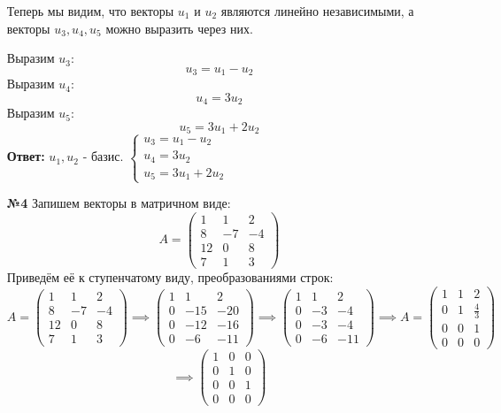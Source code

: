 \documentclass[a4paper]{article}
\newcommand{\case}[1]{\begin{cases} #1 \end{cases}}
\begin{document}
\begin{enumerate}
    Теперь мы видим, что векторы $ u_1 $ и $ u_2 $ являются линейно независимыми, а векторы $ u_3, u_4, u_5 $ можно выразить через них.
    
    Выразим $u_3$:
    $$u_3 = u_1-u_2$$
    Выразим $u_4$:
    $$u_4 = 3u_2$$
    Выразим $u_5$:
    $$u_5 = 3u_1 + 2u_2$$
    \textbf{Ответ: }$u_1, u_2$ - базис. $\case{u_3 = u_1-u_2\\u_4 = 3u_2\\u_5 = 3u_1 + 2u_2}$\\

    \item[\textbf{№4}]Запишем векторы в матричном виде:
    $$A = \begin{pmatrix}
        1 & 1 & 2 \\
        8 & -7 & -4 \\
        12 & 0 & 8 \\
        7 & 1 & 3
        \end{pmatrix}$$
    Приведём её к ступенчатому виду, преобразованиями строк:
    $$A = \begin{pmatrix}
        1 & 1 & 2 \\
        8 & -7 & -4 \\
        12 & 0 & 8 \\
        7 & 1 & 3
        \end{pmatrix} \implies \begin{pmatrix}
            1 & 1 & 2 \\
            0 & -15 & -20 \\
            0 & -12 & -16 \\
            0 & -6 & -11
            \end{pmatrix} \implies 
                \begin{pmatrix}
                1 & 1 & 2 \\
                0 & -3 & -4 \\
                0 & -3 & -4 \\
                0 & -6 & -11
                \end{pmatrix} \implies A = \begin{pmatrix}
                    1 & 1 & 2 \\
                    0 & 1 & \frac{4}{3} \\
                    0 & 0 & 1 \\
                    0 & 0 & 0
                    \end{pmatrix}$$
    $$\implies \begin{pmatrix}
        1 & 0 & 0 \\
        0 & 1 & 0 \\
        0 & 0 & 1 \\
        0 & 0 & 0
        \end{pmatrix}$$
    

\end{enumerate}
\end{document}
